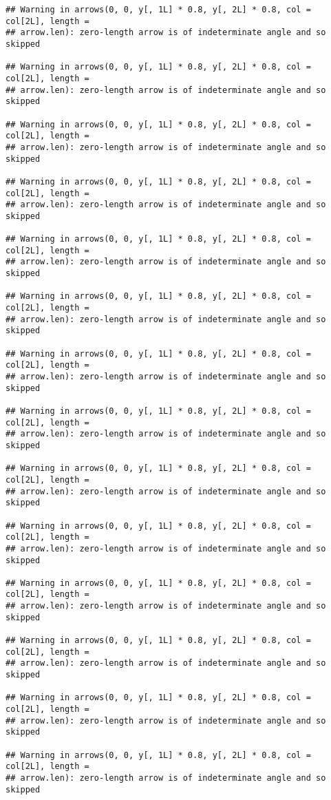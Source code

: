 \documentclass[
]{article}
\begin{document}
\begin{verbatim}
## Warning in arrows(0, 0, y[, 1L] * 0.8, y[, 2L] * 0.8, col = col[2L], length =
## arrow.len): zero-length arrow is of indeterminate angle and so skipped

## Warning in arrows(0, 0, y[, 1L] * 0.8, y[, 2L] * 0.8, col = col[2L], length =
## arrow.len): zero-length arrow is of indeterminate angle and so skipped

## Warning in arrows(0, 0, y[, 1L] * 0.8, y[, 2L] * 0.8, col = col[2L], length =
## arrow.len): zero-length arrow is of indeterminate angle and so skipped

## Warning in arrows(0, 0, y[, 1L] * 0.8, y[, 2L] * 0.8, col = col[2L], length =
## arrow.len): zero-length arrow is of indeterminate angle and so skipped

## Warning in arrows(0, 0, y[, 1L] * 0.8, y[, 2L] * 0.8, col = col[2L], length =
## arrow.len): zero-length arrow is of indeterminate angle and so skipped

## Warning in arrows(0, 0, y[, 1L] * 0.8, y[, 2L] * 0.8, col = col[2L], length =
## arrow.len): zero-length arrow is of indeterminate angle and so skipped

## Warning in arrows(0, 0, y[, 1L] * 0.8, y[, 2L] * 0.8, col = col[2L], length =
## arrow.len): zero-length arrow is of indeterminate angle and so skipped

## Warning in arrows(0, 0, y[, 1L] * 0.8, y[, 2L] * 0.8, col = col[2L], length =
## arrow.len): zero-length arrow is of indeterminate angle and so skipped

## Warning in arrows(0, 0, y[, 1L] * 0.8, y[, 2L] * 0.8, col = col[2L], length =
## arrow.len): zero-length arrow is of indeterminate angle and so skipped

## Warning in arrows(0, 0, y[, 1L] * 0.8, y[, 2L] * 0.8, col = col[2L], length =
## arrow.len): zero-length arrow is of indeterminate angle and so skipped

## Warning in arrows(0, 0, y[, 1L] * 0.8, y[, 2L] * 0.8, col = col[2L], length =
## arrow.len): zero-length arrow is of indeterminate angle and so skipped

## Warning in arrows(0, 0, y[, 1L] * 0.8, y[, 2L] * 0.8, col = col[2L], length =
## arrow.len): zero-length arrow is of indeterminate angle and so skipped

## Warning in arrows(0, 0, y[, 1L] * 0.8, y[, 2L] * 0.8, col = col[2L], length =
## arrow.len): zero-length arrow is of indeterminate angle and so skipped

## Warning in arrows(0, 0, y[, 1L] * 0.8, y[, 2L] * 0.8, col = col[2L], length =
## arrow.len): zero-length arrow is of indeterminate angle and so skipped


\end{verbatim}
\end{document}
